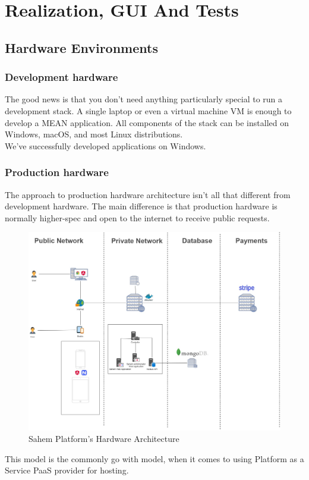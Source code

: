 

\setcounter{mtc}{11}

\chapter{Realization, GUI And Tests}%
\label{chap:chapter_four}
\minitoc

\section{Hardware Environments}

\subsection{Development hardware }
The good news is that you don’t need anything particularly special to run a development stack. A single laptop or even a virtual machine \ac{VM} is enough to develop a MEAN application. All components of the stack can be installed on Windows, macOS, and most Linux distributions.\\

We’ve successfully developed applications on Windows.\\

\subsection{Production hardware }
The approach to production hardware architecture isn’t all that different from development hardware. The main difference is that production hardware is normally higher-spec and open to the internet to receive public requests.\\

\begin{figure}[!ht]
      \centering
      \includegraphics[scale=0.30]{assets/architecturedrawio.jpg}
      \caption{Sahem Platform's Hardware Architecture}
      \label{fig:sahemarchitecturedrawio}
\end{figure}
This model is the commonly go with model, when it comes to using  Platform as a Service \ac{PaaS} provider for hosting.
